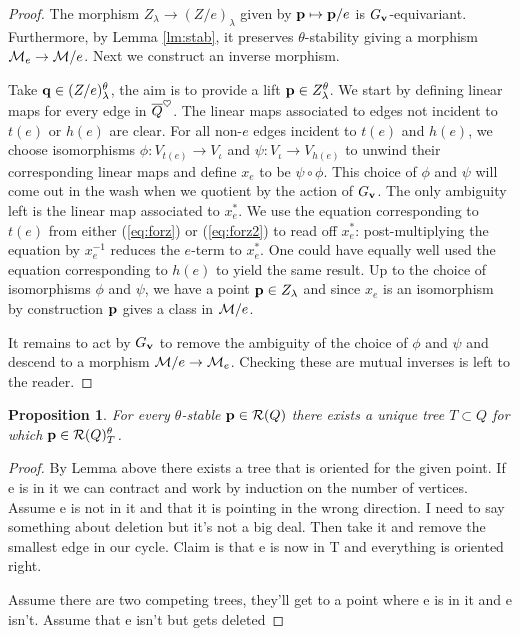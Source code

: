 \documentclass{amsart}
\newtheorem{prop}[thm]{Proposition}
\theoremstyle{definition}
\begin{document}
\begin{proof}
The morphism $Z_\lambda \rightarrow (Z/e)_\lambda$ given by $\mathbf{p} \mapsto \mathbf{p}/e$ is $G_{\mathbf{v}}$-equivariant.
Furthermore, by Lemma \ref{lm:stab}, it preserves $\theta$-stability giving a morphism $\mathcal{M}_{e} \rightarrow \mathcal{M}/e$. 
Next we construct an inverse morphism.

Take $\mathbf{q} \in (Z/e)_{\lambda}^\theta$, the aim is to provide a lift $\mathbf{p} \in Z_{\lambda}^\theta$.
We start by defining linear maps for every edge in ${\overline{Q}}^\heartsuit$.
The linear maps associated to edges not incident to $t(e)$ or $h(e)$ are clear.
For all non-$e$ edges incident to $t(e)$ and $h(e)$, we choose isomorphisms $\phi \colon V_{t(e)} \rightarrow V_\iota$ and $\psi \colon V_\iota \rightarrow V_{h(e)}$ to unwind their corresponding linear maps and define $x_e$ to be $\psi \circ \phi$.
This choice of $\phi$ and $\psi$ will come out in the wash when we quotient by the action of $G_{\mathbf{v}}$.
The only ambiguity left is the linear map associated to $x_e^*$.
We use the equation corresponding to $t(e)$ from either (\ref{eq:forz}) or (\ref{eq:forz2}) to read off $x_e^*$: post-multiplying the equation by $x_e^{-1}$ reduces the $e$-term to $x_e^*$.
One could have equally well used the equation corresponding to $h(e)$ to yield the same result.
Up to the choice of isomorphisms $\phi$ and $\psi$, we have a point $\mathbf{p} \in Z_\lambda$ and since $x_e$ is an isomorphism by construction $\mathbf{p}$ gives a class in $\mathcal{M}/e$.

It remains to act by $G_{\mathbf{v}}$ to remove the ambiguity of the choice of $\phi$ and $\psi$ and descend to a morphism $\mathcal{M}/e \rightarrow \mathcal{M}_e$.
Checking these are mutual inverses is left to the reader.
\end{proof}

\begin{prop}\label{prop:existenceanduniqueness}
For every $\theta$-stable $\mathbf{p} \in \mathcal{R}(Q)$ there exists a unique tree $T \subset Q$ for which $\mathbf{p} \in \mathcal{R}(Q)_T^\theta$. 
\end{prop}

\begin{proof}
By Lemma above there exists a tree that is oriented for the given point. If e is in it we can contract and work by induction on the number of vertices. Assume e is not in it and that it is pointing in the wrong direction. I need to say something about deletion but it's not a big deal. Then take it and remove the smallest edge in our cycle. Claim is that e is now in T and everything is oriented right.

Assume there are two competing trees, they'll get to a point where e is in it and e isn't. Assume that e isn't but gets deleted 
\end{proof}
\end{document}
